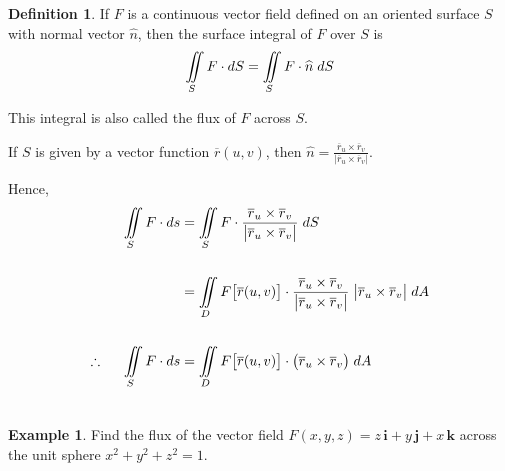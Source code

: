 \documentclass[11pt,a4paper]{article}
\theoremstyle{definition}
\newtheorem{defn}[thm]{Definition}
\newtheorem{exa}[thm]{Example}
\begin{document}
\begin{defn}


If $F$ is a continuous vector field defined on an oriented surface $S$ with normal vector $\widehat{n}$, then the surface integral of $F$ over $S$ is $$ \iint\limits_S F\cdot dS = \iint\limits_S F\cdot \widehat{n}\hspace{0.1cm} dS$$

This integral is also called the flux of $F$ across $S$.


If $S$ is given by a vector function $\overline{r}(u,v)$, then \hspace{0.2cm}
$\displaystyle{\widehat{n}=\frac{\overline{r}_u \times \overline{r}_v}{\big|\overline{r}_u \times \overline{r}_v\big|}}$.\hspace{0.2cm}

Hence,
\begin{align*}
\iint\limits_S F\cdot ds & = \iint\limits_S F \cdot \frac{\overline{r}_u \times \overline{r}_v}{\big|\overline{r}_u \times \overline{r}_v\big|}\hspace{0.1cm} dS\\\\
& = \iint\limits_D F\big[\overline{r}(u,v)\big]\cdot \frac{\overline{r}_u \times \overline{r}_v}{\big|\overline{r}_u \times \overline{r}_v\big|}\hspace{0.1cm} \big|\overline{r}_u \times \overline{r}_v\big|\hspace{0.1cm}dA\\\\
\therefore\hspace{0.5cm}\iint\limits_S F\cdot ds & = \iint\limits_D F\big[\overline{r}(u,v)\big]\cdot \big(\overline{r}_u \times \overline{r}_v\big) \hspace{0.1cm}dA\\\\
\end{align*}
\end{defn}

\begin{exa}


Find the flux of the vector field $F(x,y,z) = z\,\textbf{i} + y\,\textbf{j} + x\, \textbf{k}$ across the unit sphere $x^2 + y^2 + z^2 = 1$.
\end{exa}
\end{document}
